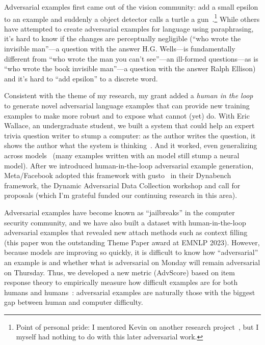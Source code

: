 Adversarial examples first came out of the vision community: add a
small epsilon to an example and suddenly a object detector calls a
turtle a gun~\cite{athalye-18}.\footnote{Point of personal pride: I
mentored Kevin on another research project~\cite{he-16}, but
I myself had nothing to do with this later adversarial work.}
%
While others have attempted to create adversarial examples for
language using paraphrasing, it's hard to know if the changes are
perceptually negligible (``who wrote the invisible man''---a question with the answer H.G. Wells---is
fundamentally different from ``who wrote the man you can't see''---an ill-formed questions---as is
``who wrote the book invisible man''---a question with the answer Ralph Ellison) and
it's hard to ``add epsilon'' to a discrete word.

Consistent with the theme of my research, my  grant
added a \emph{human in the loop} to generate novel adversarial
language examples that can provide new training examples to make
 more robust and to expose what  cannot (yet) do.
%
With Eric Wallace, an undergraduate student, we built a system that
could help an expert trivia question writer to stump a computer: as
the author writes the question, it shows the author what the system is
thinking~\cite{wallace-18}.
%
And it worked, even generalizing across models~\cite{wallace-19} (many
examples written with an  model still stump a neural model).
%
After we introduced human-in-the-loop adversarial example generation,
Meta/Facebook adopted this framework with gusto~\cite{bartolo-20} in
their Dynabench framework, the Dynamic Adversarial Data Collection
workshop and call for proposals (which I'm grateful funded our
continuing research in this area).

Adversarial examples have become known as ``jailbreaks'' in the computer security community, and we have also built a dataset with human-in-the-loop adversarial examples that revealed new attach methods such as context filling~\cite{Schulhoff:Pinto:Khan:Bouchard:Si:Boyd-Graber:Anati:Tagliabue:Kost:Carnahan-2023} (this paper won the outstanding Theme Paper award at EMNLP 2023).
%
However, because models are improving so quickly, it is difficult to know how ``adversarial'' an example is and whether what is adversarial on Monday will remain adversarial on Thursday.
%
Thus, we developed a new metric (AdvScore) based on item response theory to empirically measure how difficult examples are for both humans and humans~\cite{Sung:Gor:Fleisig:Mondal:Boyd-Graber-2025}: adversarial examples are naturally those with the biggest gap between human and computer difficulty.


